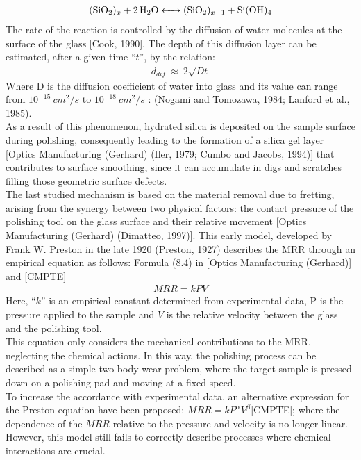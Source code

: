 \begin{align}
\ce{(SiO2)_x + 2H2O <-> (SiO2)_{x-1} + Si(OH)4} \label{eq:hydrolytic_scission}
\end{align}
The rate of the reaction is controlled by the diffusion of water molecules at the surface of the glass [Cook, 1990]. The depth of this diffusion layer can be estimated, after a given time “$t$”, by the relation: 
\begin{align}
    d_{dif}\ \approx\ 2\sqrt{Dt} \label{eq:diff_length}
\end{align}
Where D is the diffusion coefficient of water into glass and its value can range from $10^{-15} \:cm^2/s$ to $10^{-18}\: cm^2/s$ : (Nogami and Tomozawa, 1984; Lanford et al., 1985).
\\
As a result of this phenomenon, hydrated silica is deposited on the sample surface during polishing, consequently leading to the formation of a silica gel layer [Optics Manufacturing (Gerhard) (Iler, 1979; Cumbo and Jacobs, 1994)] that contributes to surface smoothing, since it can accumulate in digs and scratches filling those geometric surface defects. 
\\
The last studied mechanism is based on the material removal due to fretting, arising from the synergy between two physical factors: the contact pressure of the polishing tool on the glass surface and their relative movement [Optics Manufacturing (Gerhard) (Dimatteo, 1997)]. This early model, developed by Frank W. Preston in the late 1920 (Preston, 1927) describes the MRR through an empirical equation as follows:
Formula (8.4) in [Optics Manufacturing (Gerhard)] and [CMPTE]
\begin{align}
    MRR=kPV \label{eq:material_removal}
\end{align}
Here, “$k$” is an empirical constant determined from experimental data, P is the pressure applied to the sample and $V$ is the relative velocity between the glass and the polishing tool.
\\
This equation only considers the mechanical contributions to the MRR, neglecting the chemical actions. In this way, the polishing process can be described as a simple two body wear problem, where the target sample is pressed down on a polishing pad and moving at a fixed speed.
\\
To increase the accordance with experimental data, an alternative expression for the Preston equation have been proposed: $MRR=kP^\alpha V^\beta$[CMPTE]; where the dependence of the $MRR$ relative to the pressure and velocity is no longer linear. However, this model still fails to correctly describe processes where chemical interactions are crucial.

